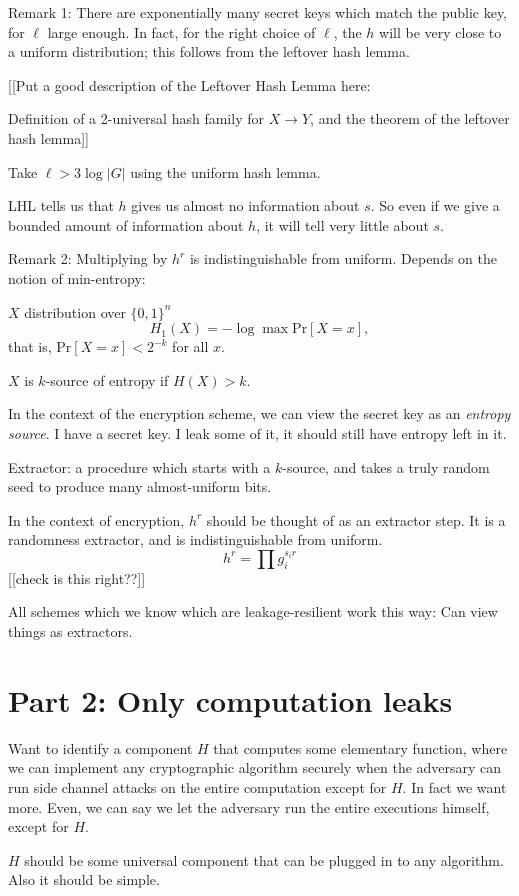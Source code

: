 \documentclass[10pt]{article}
\newcommand{\bit}{\{0,1\}}
\newcommand{\Prob}[1]{\text{Pr}\left[ {#1} \right]}
\begin{document}
Remark 1: There are exponentially many secret keys which match the public key, for $\ell$ large enough. In fact, for the right choice of $\ell$, the $h$ will be very close to a uniform distribution; this follows from the leftover hash lemma. 

[[Put a good description of the Leftover Hash Lemma here:

Definition of a 2-universal hash family for $X \to Y$, and the theorem of the leftover hash lemma]]

Take $\ell > 3 \log |G|$ using the uniform hash lemma.

LHL tells us that $h$ gives us almost no information about $s$. So even if we give a bounded amount of information about $h$, it will tell very little about $s$.

Remark 2: Multiplying by $h^r$ is indistinguishable from uniform.  Depends on the notion of min-entropy:

$X$ distribution over $\bit^n$
\[
H_1(X) = -\log \max \Prob{X = x},
\]
that is, $\Prob{X = x} < 2^{-k}$ for all $x$.

$X$ is $k$-source of entropy if $H(X) > k$.

In the context of the encryption scheme, we can view the secret key as an \emph{entropy source}. I have a secret key. I leak some of it, it should still have entropy left in it.

Extractor: a procedure which starts with a $k$-source, and takes a truly random seed to produce many almost-uniform bits.

In the context of encryption, $h^r$ should be thought of as an extractor step. It is a randomness extractor, and is indistinguishable from uniform.
\[
h^r = \prod g_i^{s_i r}
\]
[[check is this right??]]

All schemes which we know which are leakage-resilient work this way: Can view things as extractors.

\section{Part 2: Only computation leaks}

Want to identify a component $H$ that computes some elementary function, where we can implement any cryptographic algorithm securely when the adversary can run side channel attacks on the entire computation except for $H$. In fact we want more. Even, we can say we let the adversary run the entire executions himself, except for $H$.

$H$ should be some universal component that can be plugged in to any algorithm. Also it should be simple.
\end{document}
